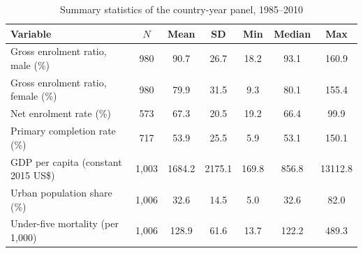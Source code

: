 \begin{table}[t]
\centering
\begin{threeparttable}
\caption{Summary statistics of the country-year panel, 1985--2010}
\label{tab:summary}
\begin{tabular}{lcccccc}
\toprule
Variable & $N$ & Mean & SD & Min & Median & Max \\
\midrule
Gross enrolment ratio, male (\%) & 980 & 90.7 & 26.7 & 18.2 & 93.1 & 160.9 \\
Gross enrolment ratio, female (\%) & 980 & 79.9 & 31.5 & 9.3 & 80.1 & 155.4 \\
Net enrolment rate (\%) & 573 & 67.3 & 20.5 & 19.2 & 66.4 & 99.9 \\
Primary completion rate (\%) & 717 & 53.9 & 25.5 & 5.9 & 53.1 & 150.1 \\
GDP per capita (constant 2015 US\$) & 1,003 & 1684.2 & 2175.1 & 169.8 & 856.8 & 13112.8 \\
Urban population share (\%) & 1,006 & 32.6 & 14.5 & 5.0 & 32.6 & 82.0 \\
Under-five mortality (per 1,000) & 1,006 & 128.9 & 61.6 & 13.7 & 122.2 & 489.3 \\
\bottomrule
\end{tabular}
\end{threeparttable}
\end{table}
